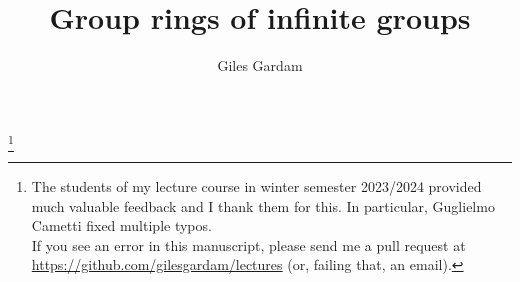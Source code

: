 \documentclass[oneside]{amsbook}
\theoremstyle{definition}
\theoremstyle{remark}
\numberwithin{section}{chapter}
\numberwithin{equation}{chapter}
\begin{document}
\frontmatter

\title{Group rings of infinite groups}
\author{Giles Gardam}
\address{University of Bonn}
\thanks{The students of my lecture course in winter semester 2023/2024 provided much valuable feedback and I thank them for this. In particular, Guglielmo Cametti fixed multiple typos. \\ If you see an error in this manuscript, please send me a pull request at \url{https://github.com/gilesgardam/lectures} (or, failing that, an email).}

\maketitle
\tableofcontents


\mainmatter



\appendix




\backmatter




\printindex
\end{document}
